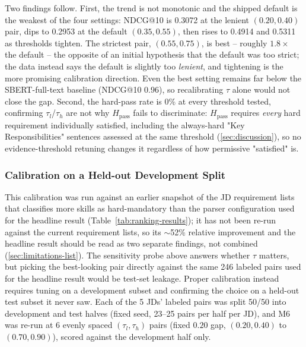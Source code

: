 \documentclass[12pt,a4paper,oneside]{report}
\begin{document}
Two findings follow. First, the trend is not monotonic and the shipped default is the weakest of the four settings: NDCG@10 is 0.3072 at the lenient $(0.20,0.40)$ pair, dips to 0.2953 at the default $(0.35,0.55)$, then rises to 0.4914 and 0.5311 as thresholds tighten. The strictest pair, $(0.55,0.75)$, is best -- roughly $1.8\times$ the default -- the opposite of an initial hypothesis that the default was too strict; the data instead says the default is slightly too \emph{lenient}, and tightening is the more promising calibration direction. Even the best setting remains far below the SBERT-full-text baseline (NDCG@10 0.96), so recalibrating $\tau$ alone would not close the gap. Second, the hard-pass rate is 0\% at every threshold tested, confirming $\tau_l$/$\tau_h$ are not why $H_{\mathrm{pass}}$ fails to discriminate: $H_{\mathrm{pass}}$ requires \emph{every} hard requirement individually satisfied, including the always-hard "Key Responsibilities" sentences assessed at the same threshold (\cref{sec:discussion}), so no evidence-threshold retuning changes it regardless of how permissive "satisfied" is.

\subsubsection{Calibration on a Held-out Development Split}
\label{sec:calibration}
This calibration was run against an earlier snapshot of the JD requirement lists that classifies more skills as hard-mandatory than the parser configuration used for the headline result (Table~\ref{tab:ranking-results}); it has not been re-run against the current requirement lists, so its $\sim$52\% relative improvement and the headline result should be read as two separate findings, not combined (\cref{sec:limitations-list}). The sensitivity probe above answers whether $\tau$ matters, but picking the best-looking pair directly against the same 246 labeled pairs used for the headline result would be test-set leakage. Proper calibration instead requires tuning on a development subset and confirming the choice on a held-out test subset it never saw. Each of the 5 JDs' labeled pairs was split 50/50 into development and test halves (fixed seed, 23--25 pairs per half per JD), and M6 was re-run at 6 evenly spaced $(\tau_l,\tau_h)$ pairs (fixed $0.20$ gap, $(0.20,0.40)$ to $(0.70,0.90)$), scored against the development half only.
\end{document}
